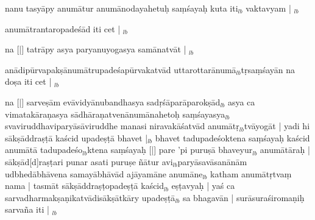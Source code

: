 \documentclass[article,12pt,a4paper]{memoir}%
\newcounter{parCount}
\begin{document}
	  
	  \pstart \leavevmode%
	nanu tasyāpy anumātur anumānodayahetuḥ saṃśayaḥ kuta iti{\tiny $_{lb}$} vaktavyam |
	{}
	\pend%
      {\tiny $_{lb}$}

	  
	  \pstart \leavevmode%
	anumātrantaropadeśād iti cet |
	{}
	\pend%
      {\tiny $_{lb}$}

	  
	  \pstart \leavevmode%
	na [|] tatrāpy asya paryanuyogasya samānatvāt |
	{}
	\pend%
      {\tiny $_{lb}$}

	  
	  \pstart \leavevmode%
	anādipūrvapakṣānumātrupadeśapūrvakatvād uttarottarānumā{\tiny $_{lb}$}tṛsaṃśayān na doṣa iti cet |
	{}
	\pend%
      {\tiny $_{lb}$}

	  
	  \pstart \leavevmode%
	na [|] sarveṣām evāvidyānubandhasya sadṛśāparāparokṣād{\tiny $_{lb}$} asya ca vimatakāraṇasya sādhāraṇatvenānumānahetoḥ saṃśayasya{\tiny $_{lb}$} svaviruddhaviparyāsāviruddhe manasi niravakāśatvād anumātṛ{\tiny $_{lb}$}tvāyogāt | yadi hi sākṣāddraṣṭā kaścid upadeṣṭā bhavet |{\tiny $_{lb}$} bhavet tadupadeśoktena saṃśayaḥ kaścid anumātā tadupadeśo{\tiny $_{lb}$}ktena saṃśayaḥ [|] pare 'pi puruṣā bhave\leavevmode{}yur{\tiny $_{lb}$} anumātāraḥ | sākṣād[d]raṣṭari punar asati puruṣe ñātur avi{\tiny $_{lb}$}paryāsavāsanānām udbhedābhāvena samayābhāvād ajāyamāne anumāne{\tiny $_{lb}$} katham anumātṛtvaṃ nama | tasmāt sākṣāddraṣṭopadeṣṭā kaścid{\tiny $_{lb}$} eṣṭavyaḥ | yaś ca sarvadharmakṣaṇikatvādisākṣātkāry upadeṣṭā{\tiny $_{lb}$} sa bhagavān | surāsuraśiromaṇiḥ sarvaña iti |
	{}
	\pend%
      {\tiny $_{lb}$}
	    
\end{document}
